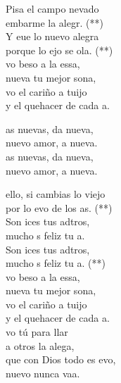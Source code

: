 \begin{cancion}%
	Pisa el campo nevado\\
	embarme la alegr. (**) \\
	Y eue lo nuevo  alegra \\
	porque lo ejo se ola. (**)\\
	vo beso a la essa, \\
	nueva tu mejor sona,\\
	vo el cariño a tuijo \\
	y el quehacer de cada a.\\
	\begin{chorus}%
	as nuevas, da nueva, \\
	nuevo amor, a nueva.\\
	as nuevas, da nueva, \\
	nuevo amor, a nueva.\\
	\end{chorus}%
	 ello, si cambias lo viejo \\
	por lo evo de los as. (**)\\
	Son ices tus adtros, \\
	mucho s feliz tu a. \\
	Son ices tus adtros, \\
	mucho s feliz tu a. (**) \\
	vo beso a la essa, \\
	nueva tu mejor sona,\\
	vo el cariño a tuijo \\
	y el quehacer de cada a.\\
	vo tú para llar \\
	a otros la alega,\\
	que con Dios todo es evo, \\
	nuevo nunca vaa.\\
\end{cancion}%
